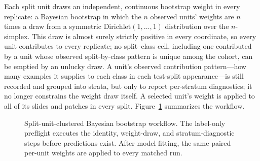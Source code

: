 \documentclass[11pt]{article}
\begin{document}
Each split unit draws an independent, continuous bootstrap weight in every replicate: a Bayesian bootstrap \citep{rubin1981bayesian} in which the $n$ observed units' weights are $n$ times a draw from a symmetric $\mathrm{Dirichlet}(1,\ldots,1)$ distribution over the $n$-simplex. This draw is almost surely strictly positive in every coordinate, so every unit contributes to every replicate; no split--class cell, including one contributed by a unit whose observed split-by-class pattern is unique among the cohort, can be emptied by an unlucky draw. A unit's observed contribution pattern---how many examples it supplies to each class in each test-split appearance---is still recorded and grouped into strata, but only to report per-stratum diagnostics; it no longer constrains the weight draw itself. A selected unit's weight is applied to all of its slides and patches in every split. Figure~\ref{fig:bootstrap-workflow} summarizes the workflow.

\begin{figure}[ht]
  \centering
  \caption{Split-unit-clustered Bayesian bootstrap workflow. The label-only preflight executes the identity, weight-draw, and stratum-diagnostic steps before predictions exist. After model fitting, the same paired per-unit weights are applied to every matched run.}
  \label{fig:bootstrap-workflow}
\end{figure}
\end{document}
